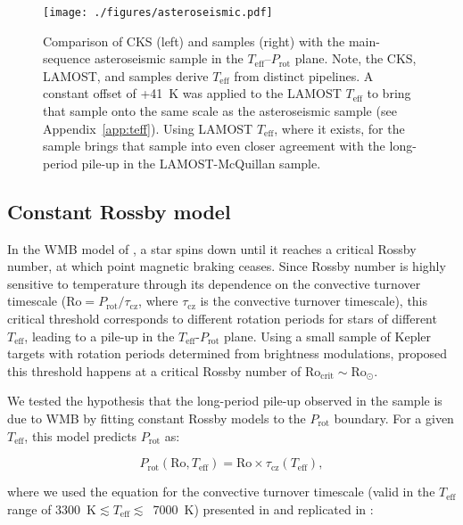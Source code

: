 \documentclass[linenumbers,trackchanges,twocolumn]{aastex631}
\newcommand{\lamostmcq}{LAMOST--McQuillan\xspace}
\newcommand{\teff}{\ensuremath{T_{\mathrm{eff}}}\xspace}
\newcommand{\prot}{\ensuremath{P_\mathrm{rot}}\xspace}
\begin{document}
\begin{figure}
    \centering
    \texttt{[image: ./figures/asteroseismic.pdf]}
    \caption{Comparison of CKS (left) and \edit1{\lamostmcq} samples (right) with the \citet{Hall2021} main-sequence asteroseismic sample in the \teff--\prot plane. Note, the CKS, LAMOST, and \citet{Hall2021} samples derive \teff from distinct pipelines. A constant offset of +41~K was applied to the LAMOST \teff to bring that sample onto the same scale as the asteroseismic sample (see Appendix~\ref{app:teff}). Using LAMOST \teff, where it exists, for the \citet{Hall2021} sample brings that sample into even closer agreement with the long-period pile-up in the LAMOST-McQuillan sample.}
    \label{fig:asteroseismic}
\end{figure}

\subsection{Constant Rossby model}
\label{subsec:rossby}
In the WMB model of \citet{vanSaders2016, vanSaders2019}, a star spins down until it reaches a critical Rossby number, at which point magnetic braking ceases. Since Rossby number is highly sensitive to temperature through its dependence on the convective turnover timescale ($\mathrm{Ro} = P_\mathrm{rot}/\tau_\mathrm{cz}$, where $\tau_\mathrm{cz}$ is the convective turnover timescale), this critical threshold corresponds to different rotation periods for stars of different \teff, leading to a pile-up in the \teff-\prot plane. Using a small sample of Kepler targets with rotation periods determined from brightness modulations, \citet{vanSaders2016} proposed this threshold happens at a critical Rossby number of $\mathrm{Ro_{crit}} \sim \mathrm{Ro_\odot}$. 

We tested the hypothesis that the long-period pile-up observed in the \edit1{\lamostmcq} sample is due to WMB by fitting constant Rossby models to the \prot boundary. For a given \teff, this model predicts \prot as: 

\begin{equation} \label{eq:1}
    \prot (\mathrm{Ro}, \teff) = \mathrm{Ro} \times \tau_\mathrm{cz}(\teff),
\end{equation}

where we used the equation for the convective turnover timescale (valid in the \teff range of 3300~K$\lesssim \teff \lesssim$~7000~K) presented in \citet{Gunn1998} and replicated in \citet{CranmerSaar2011}:
\end{document}
